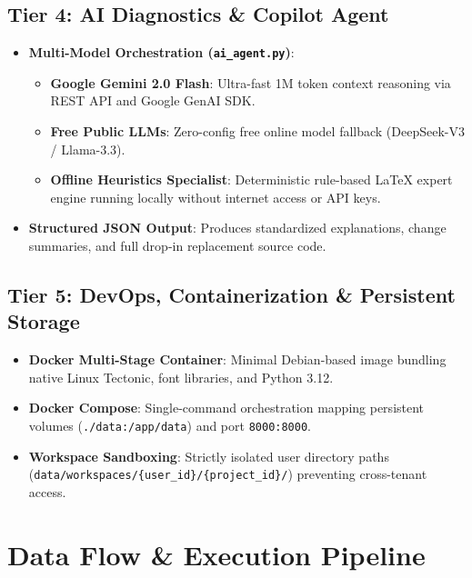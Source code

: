 \documentclass[11pt,a4paper]{article}
\begin{document}
\subsection{Tier 4: AI Diagnostics \& Copilot Agent}
\begin{itemize}[leftmargin=1.5em]
    \item \textbf{Multi-Model Orchestration (\texttt{ai\_agent.py})}:
    \begin{itemize}
        \item \textbf{Google Gemini 2.0 Flash}: Ultra-fast 1M token context reasoning via REST API and Google GenAI SDK.
        \item \textbf{Free Public LLMs}: Zero-config free online model fallback (DeepSeek-V3 / Llama-3.3).
        \item \textbf{Offline Heuristics Specialist}: Deterministic rule-based LaTeX expert engine running locally without internet access or API keys.
    \end{itemize}
    \item \textbf{Structured JSON Output}: Produces standardized explanations, change summaries, and full drop-in replacement source code.
\end{itemize}

\subsection{Tier 5: DevOps, Containerization \& Persistent Storage}
\begin{itemize}[leftmargin=1.5em]
    \item \textbf{Docker Multi-Stage Container}: Minimal Debian-based image bundling native Linux Tectonic, font libraries, and Python 3.12.
    \item \textbf{Docker Compose}: Single-command orchestration mapping persistent volumes (\texttt{./data:/app/data}) and port \texttt{8000:8000}.
    \item \textbf{Workspace Sandboxing}: Strictly isolated user directory paths (\texttt{data/workspaces/\{user\_id\}/\{project\_id\}/}) preventing cross-tenant access.
\end{itemize}

\section{Data Flow \& Execution Pipeline}
\end{document}
